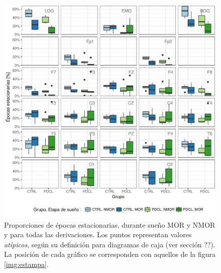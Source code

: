 \documentclass[12pt,letterpaper,draft]{book}
\begin{document}
\begin{figure}
\centering
\includegraphics[width=\linewidth]
{./scripts_graf_res/comparacion_cabeza.pdf}
\caption{Proporciones de épocas estacionarias, durante sueño MOR y NMOR y para todas las derivaciones.
%
Los puntos representan valores \textit{atípicos}, según su definición para diagramas de caja (ver sección ??).
%
La posición de cada gráfico se corresponden con aquellos de la figura \ref{img:estampa}.}
\label{comparacion_verde}
\end{figure}

%

\end{document}

